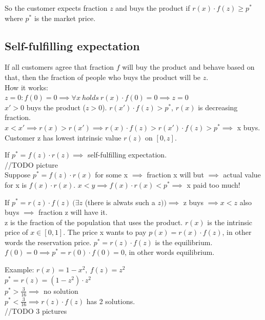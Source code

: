\documentclass[12pt]{scrartcl}
\begin{document}
So the customer expects fraction $z$ and buys the product if $r(x)\cdot f(z) \geq p^{*}$ where $p^{*}$ is the market price.\\

\subsection{Self-fulfilling expectation}
If all customers agree that fraction $f$ will buy the product and behave based on that, then the fraction of people who buys the product will be $z$.\\
How it works:\\
$z = 0: f(0) = 0 \implies \forall x\ holds\ r(x)\cdot f(0) = 0 \implies z = 0$\\ 
$x' > 0$ buys the product ($z > 0$). 
$r(x')\cdot f(z) > p^{*}$, $r(x)$ is decreasing fraction.\\
$x < x' \implies r(x) > r(x') \implies r(x)\cdot f(z) > r(x')\cdot f(z) > p^{*} \implies$ x buys.\\

\noindent Customer z has lowest intrinsic value $r(z)$ on $[0,z]$.

\noindent If $p^{*} = f(z)\cdot r(z) \implies$ self-fulfilling expectation.
\\//TODO picture\\

\noindent Suppose $p^{*} = f(z)\cdot r(x)$ for some x $\implies$ fraction x will but $\implies$ actual value for x is $f(x)\cdot r(x)$. $x < y \implies f(x)\cdot r(x) < p^{*} \implies$ x paid too much!

\noindent If $p^{*} = r(z)\cdot f(z)\ (\exists z$ (there is alwats such a $z)) \implies$ z buys $\implies x< z$ also buys $\implies$ fraction z will have it.\\

\noindent z is the fraction of the population that uses the product. $r(x)$ is the intrinsic price of $x \in [0,1]$. The price x wants to pay $p(x) = r(x)\cdot f(z) $, in other words the reservation price. $p^{*} = r(z)\cdot f(z)$ is the equilibrium.
$f(0) = 0 \implies p^{*} = r(0)\cdot f(0) = 0$, in other words equilibrium.




\newpage
\noindent Example: $r(x) = 1 - x^{2},\ f(z) = z^{2}$\\
$p^{*} = r(z) = (1-z^{2})\cdot z^{2}$\\

\noindent $p^{*} > \frac{3}{16} \implies$ no solution\\
$p^{*} < \frac{3}{16} \implies r(z)\cdot f(z)$ has 2 solutions.
\\//TODO 3 pictures\\
\end{document}
